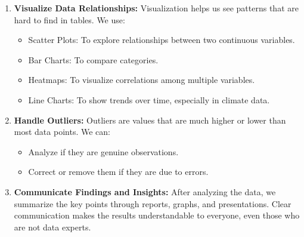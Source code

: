\begin{enumerate}
    \item \textbf{Visualize Data Relationships:} Visualization helps us see patterns that are hard to find in tables. We use:
    \begin{itemize}
        \item Scatter Plots: To explore relationships between two continuous variables.
        \item Bar Charts: To compare categories.
        \item Heatmaps: To visualize correlations among multiple variables.
        \item Line Charts: To show trends over time, especially in climate data.
    \end{itemize}
    
    \item \textbf{Handle Outliers:} Outliers are values that are much higher or lower than most data points. We can:
    \begin{itemize}
        \item Analyze if they are genuine observations.
        \item Correct or remove them if they are due to errors.
    \end{itemize}
    
    \item \textbf{Communicate Findings and Insights:} After analyzing the data, we summarize the key points through reports, graphs, and presentations. Clear communication makes the results understandable to everyone, even those who are not data experts.
\end{enumerate}

